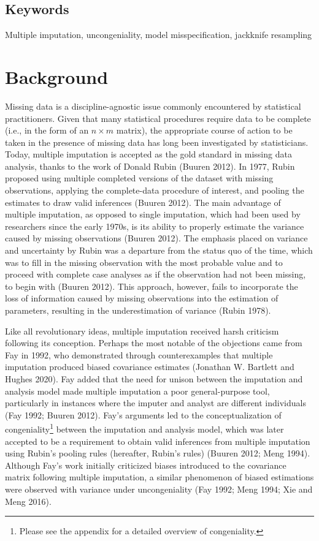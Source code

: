 \documentclass[
  letterpaper,
  DIV=11,
  numbers=noendperiod]{scrreprt}
\begin{document}
\hypertarget{keywords}{%
\section{Keywords}\label{keywords}}

Multiple imputation, uncongeniality, model misspecification, jackknife
resampling


\hypertarget{background}{%
\chapter{Background}\label{background}}

Missing data is a discipline-agnostic issue commonly encountered by
statistical practitioners. Given that many statistical procedures
require data to be complete (i.e., in the form of an \(n \times m\)
matrix), the appropriate course of action to be taken in the presence of
missing data has long been investigated by statisticians. Today,
multiple imputation is accepted as the gold standard in missing data
analysis, thanks to the work of Donald Rubin (Buuren 2012). In 1977,
Rubin proposed using multiple completed versions of the dataset with
missing observations, applying the complete-data procedure of interest,
and pooling the estimates to draw valid inferences (Buuren 2012). The
main advantage of multiple imputation, as opposed to single imputation,
which had been used by researchers since the early 1970s, is its ability
to properly estimate the variance caused by missing observations (Buuren
2012). The emphasis placed on variance and uncertainty by Rubin was a
departure from the status quo of the time, which was to fill in the
missing observation with the most probable value and to proceed with
complete case analyses as if the observation had not been missing, to
begin with (Buuren 2012). This approach, however, fails to incorporate
the loss of information caused by missing observations into the
estimation of parameters, resulting in the underestimation of variance
(Rubin 1978).

Like all revolutionary ideas, multiple imputation received harsh
criticism following its conception. Perhaps the most notable of the
objections came from Fay in 1992, who demonstrated through
counterexamples that multiple imputation produced biased covariance
estimates (Jonathan W. Bartlett and Hughes 2020). Fay added that the
need for unison between the imputation and analysis model made multiple
imputation a poor general-purpose tool, particularly in instances where
the imputer and analyst are different individuals (Fay 1992; Buuren
2012). Fay's arguments led to the conceptualization of
congeniality\footnote{Please see the appendix for a detailed overview of
  congeniality.} between the imputation and analysis model, which was
later accepted to be a requirement to obtain valid inferences from
multiple imputation using Rubin's pooling rules (hereafter, Rubin's
rules) (Buuren 2012; Meng 1994). Although Fay's work initially
criticized biases introduced to the covariance matrix following multiple
imputation, a similar phenomenon of biased estimations were observed
with variance under uncongeniality (Fay 1992; Meng 1994; Xie and Meng
2016).
\end{document}
